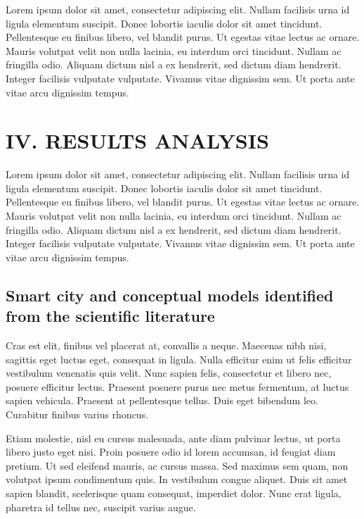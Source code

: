 \documentclass[a4paper,fleqn,spanish]{cas-dc}
\begin{document}
Lorem ipsum dolor sit amet, consectetur adipiscing elit. Nullam facilisis urna
id ligula elementum suscipit. Donec lobortis iaculis dolor sit amet tincidunt.
Pellentesque eu finibus libero, vel blandit purus. Ut egestas vitae lectus ac
ornare. Mauris volutpat velit non nulla lacinia, eu interdum orci tincidunt.
Nullam ac fringilla odio. Aliquam dictum nisl a ex hendrerit, sed dictum diam
hendrerit. Integer facilisis vulputate vulputate. Vivamus vitae dignissim sem.
Ut porta ante vitae arcu dignissim tempus.


\section{IV. RESULTS ANALYSIS}\label{resultados}

Lorem ipsum dolor sit amet, consectetur adipiscing elit. Nullam facilisis urna
id ligula elementum suscipit. Donec lobortis iaculis dolor sit amet tincidunt.
Pellentesque eu finibus libero, vel blandit purus. Ut egestas vitae lectus ac
ornare. Mauris volutpat velit non nulla lacinia, eu interdum orci tincidunt.
Nullam ac fringilla odio. Aliquam dictum nisl a ex hendrerit, sed dictum diam
hendrerit. Integer facilisis vulputate vulputate. Vivamus vitae dignissim sem.
Ut porta ante vitae arcu dignissim tempus.


\subsection{Smart city and conceptual models identified from the scientific literature}\label{sci-lit}

Cras est elit, finibus vel placerat at, convallis a neque. Maecenas nibh nisi,
sagittis eget luctus eget, consequat in ligula. Nulla efficitur enim ut felis
efficitur vestibulum venenatis quis velit. Nunc sapien felis, consectetur et
libero nec, posuere efficitur lectus. Praesent posuere purus nec metus
fermentum, at luctus sapien vehicula. Praesent at pellentesque tellus. Duis eget
bibendum leo. Curabitur finibus varius rhoncus.

Etiam molestie, nisl eu cursus malesuada, ante diam pulvinar lectus, ut porta
libero justo eget nisi. Proin posuere odio id lorem accumsan, id feugiat diam
pretium. Ut sed eleifend mauris, ac cursus massa. Sed maximus sem quam, non
volutpat ipsum condimentum quis. In vestibulum congue aliquet. Duis sit amet
sapien blandit, scelerisque quam consequat, imperdiet dolor. Nunc erat ligula,
pharetra id tellus nec, suscipit varius augue.
\end{document}

